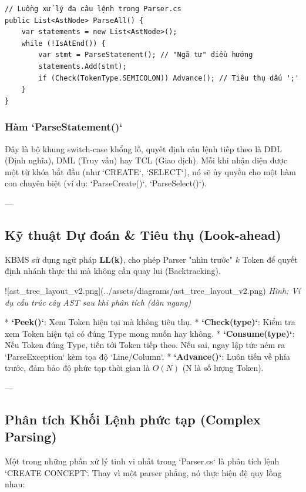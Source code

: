 \begin{verbatim}
// Luồng xử lý đa câu lệnh trong Parser.cs
public List<AstNode> ParseAll() {
    var statements = new List<AstNode>();
    while (!IsAtEnd()) {
        var stmt = ParseStatement(); // "Ngã tư" điều hướng
        statements.Add(stmt);
        if (Check(TokenType.SEMICOLON)) Advance(); // Tiêu thụ dấu ';'
    }
}
\end{verbatim}

\subsubsection{Hàm `ParseStatement()`}
Đây là bộ khung switch-case khổng lồ, quyết định câu lệnh tiếp theo là DDL (Định nghĩa), DML (Truy vấn) hay TCL (Giao dịch). Mỗi khi nhận diện được một từ khóa bắt đầu (như `CREATE`, `SELECT`), nó sẽ ủy quyền cho một hàm con chuyên biệt (ví dụ: `ParseCreate()`, `ParseSelect()`).

---

\subsection{Kỹ thuật Dự đoán & Tiêu thụ (Look-ahead)}

KBMS sử dụng ngữ pháp \textbf{LL(k)}, cho phép Parser "nhìn trước" $k$ Token để quyết định nhánh thực thi mà không cần quay lui (Backtracking).

![ast\_tree\_layout\_v2.png](../assets/diagrams/ast\_tree\_layout\_v2.png)
\textit{Hình: Ví dụ cấu trúc cây AST sau khi phân tích (dàn ngang)}

*   \textbf{`Peek()`}: Xem Token hiện tại mà không tiêu thụ.
*   \textbf{`Check(type)`}: Kiểm tra xem Token hiện tại có đúng Type mong muốn hay không.
*   \textbf{`Consume(type)`}: Nếu Token đúng Type, tiến tới Token tiếp theo. Nếu sai, ngay lập tức ném ra `ParseException` kèm tọa độ `Line/Column`.
*   \textbf{`Advance()`}: Luôn tiến về phía trước, đảm bảo độ phức tạp thời gian là $O(N)$ (N là số lượng Token).

---

\subsection{Phân tích Khối Lệnh phức tạp (Complex Parsing)}

Một trong những phần xử lý tinh vi nhất trong `Parser.cs` là phân tích lệnh `CREATE CONCEPT`. Thay vì một parser phẳng, nó thực hiện đệ quy lồng nhau:

